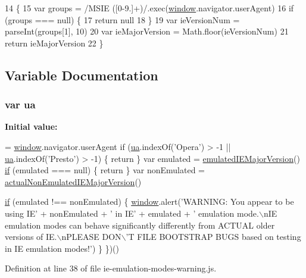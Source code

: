 \begin{DoxyCode}
14                                     \{
15     var groups = /MSIE ([0-9.]+)/.exec(\hyperlink{ripples_8js_a04a8a2bbfa9c15500892b8e5033d625b}{window}.navigator.userAgent)
16     \textcolor{keywordflow}{if} (groups === null) \{
17       \textcolor{keywordflow}{return} null
18     \}
19     var ieVersionNum = parseInt(groups[1], 10)
20     var ieMajorVersion = Math.floor(ieVersionNum)
21     return ieMajorVersion
22   \}
\end{DoxyCode}


\subsection{Variable Documentation}
\subsubsection[{\texorpdfstring{ua}{ua}}]{\setlength{\rightskip}{0pt plus 5cm}var ua}\hypertarget{ie-emulation-modes-warning_8js_a77a824a514e5c023c3617f2f740c707e}{}\label{ie-emulation-modes-warning_8js_a77a824a514e5c023c3617f2f740c707e}
{\bfseries Initial value\+:}
\begin{DoxyCode}
= \hyperlink{ripples_8js_a04a8a2bbfa9c15500892b8e5033d625b}{window}.navigator.userAgent
  \textcolor{keywordflow}{if} (\hyperlink{ie-emulation-modes-warning_8js_a77a824a514e5c023c3617f2f740c707e}{ua}.indexOf(\textcolor{stringliteral}{'Opera'}) > -1 || \hyperlink{ie-emulation-modes-warning_8js_a77a824a514e5c023c3617f2f740c707e}{ua}.indexOf(\textcolor{stringliteral}{'Presto'}) > -1) \{
    \textcolor{keywordflow}{return} 
  \}
  var emulated = \hyperlink{ie-emulation-modes-warning_8js_a0d49bb3ac3a67ced06fe8828d80f09d3}{emulatedIEMajorVersion}()
  \hyperlink{jquery_8js_a9db6d45a025ad692282fe23e69eeba43}{if} (emulated === null) \{
    \textcolor{keywordflow}{return} 
  \}
  var nonEmulated = \hyperlink{ie-emulation-modes-warning_8js_a57d09af6df991e1d9995cbd34d71cf55}{actualNonEmulatedIEMajorVersion}()

  \hyperlink{jquery_8js_a9db6d45a025ad692282fe23e69eeba43}{if} (emulated !== nonEmulated) \{
    \hyperlink{ripples_8js_a04a8a2bbfa9c15500892b8e5033d625b}{window}.alert(\textcolor{stringliteral}{'WARNING: You appear to be using IE'} + nonEmulated + \textcolor{stringliteral}{' in IE'} + emulated + \textcolor{stringliteral}{'
       emulation mode.\(\backslash\)nIE emulation modes can behave significantly differently from ACTUAL older versions of IE.\(\backslash\)nPLEASE
       DON\(\backslash\)'T FILE BOOTSTRAP BUGS based on testing in IE emulation modes!'})
  \}
\})()
\end{DoxyCode}


Definition at line 38 of file ie-\/emulation-\/modes-\/warning.\+js.

